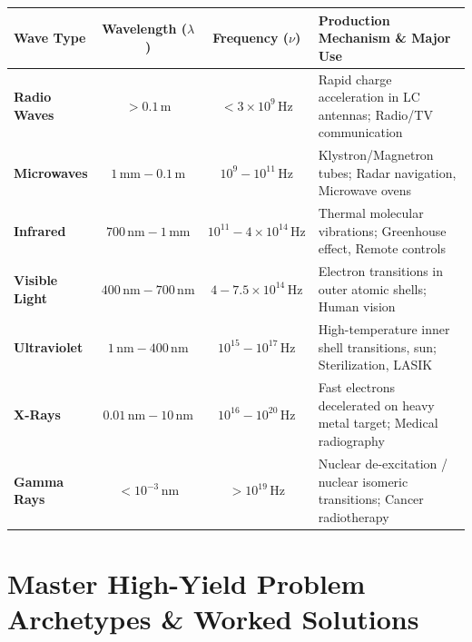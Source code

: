 \documentclass[10pt,a4paper]{article}
\begin{document}
\begin{formulabox}
\begin{center}
\begin{tabularx}{\linewidth}{|l|c|c|Y|}
\hline
\textbf{Wave Type} & \textbf{Wavelength ($\lambda$)} & \textbf{Frequency ($\nu$)} & \textbf{Production Mechanism \& Major Use} \\
\hline
\textbf{Radio Waves} & $> 0.1\,\mathrm{m}$ & $< 3 \times 10^9\,\mathrm{Hz}$ & Rapid charge acceleration in LC antennas; Radio/TV communication \\
\hline
\textbf{Microwaves} & $1\,\mathrm{mm} - 0.1\,\mathrm{m}$ & $10^9 - 10^{11}\,\mathrm{Hz}$ & Klystron/Magnetron tubes; Radar navigation, Microwave ovens \\
\hline
\textbf{Infrared} & $700\,\mathrm{nm} - 1\,\mathrm{mm}$ & $10^{11} - 4 \times 10^{14}\,\mathrm{Hz}$ & Thermal molecular vibrations; Greenhouse effect, Remote controls \\
\hline
\textbf{Visible Light} & $400\,\mathrm{nm} - 700\,\mathrm{nm}$ & $4 - 7.5 \times 10^{14}\,\mathrm{Hz}$ & Electron transitions in outer atomic shells; Human vision \\
\hline
\textbf{Ultraviolet} & $1\,\mathrm{nm} - 400\,\mathrm{nm}$ & $10^{15} - 10^{17}\,\mathrm{Hz}$ & High-temperature inner shell transitions, sun; Sterilization, LASIK \\
\hline
\textbf{X-Rays} & $0.01\,\mathrm{nm} - 10\,\mathrm{nm}$ & $10^{16} - 10^{20}\,\mathrm{Hz}$ & Fast electrons decelerated on heavy metal target; Medical radiography \\
\hline
\textbf{Gamma Rays} & $< 10^{-3}\,\mathrm{nm}$ & $> 10^{19}\,\mathrm{Hz}$ & Nuclear de-excitation / nuclear isomeric transitions; Cancer radiotherapy \\
\hline
\end{tabularx}
\end{center}
\end{formulabox}

\section{Master High-Yield Problem Archetypes \& Worked Solutions}
\end{document}
